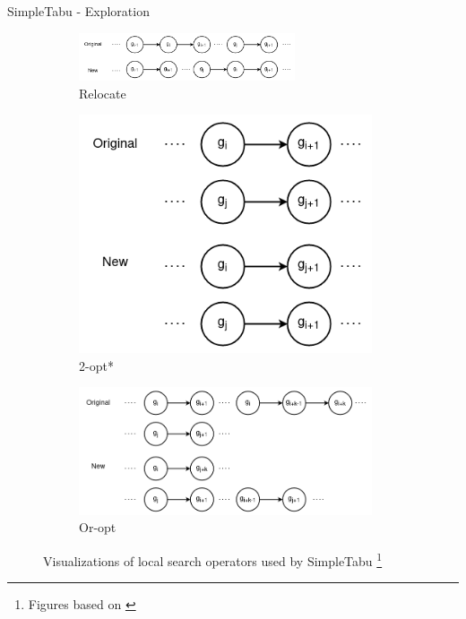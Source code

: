 \documentclass[9pt]{beamer}
\begin{document}
\begin{frame}{SimpleTabu - Exploration}
    \begin{figure}[ht]
        \centering
        \begin{subfigure}[b]{\linewidth}
            \centering
            \includegraphics[width=0.7\textwidth]{images/lsops-relocate.png}
            \caption{Relocate}
        \end{subfigure}
        \begin{subfigure}[b]{0.35\linewidth}
            \centering
            \includegraphics[width=0.95\textwidth]{images/lsops-2-opt.png}
            \caption{2-opt*}
        \end{subfigure}
        \begin{subfigure}[b]{0.63\linewidth}
            \centering
            \includegraphics[width=0.95\textwidth]{images/lsops-or-opt.png}
            \caption{Or-opt}
        \end{subfigure}
        \caption{Visualizations of local search operators used by SimpleTabu \footnote{Figures based on \cite{mcnabb2015testing}}}
    \end{figure}
\end{frame}
\end{document}
